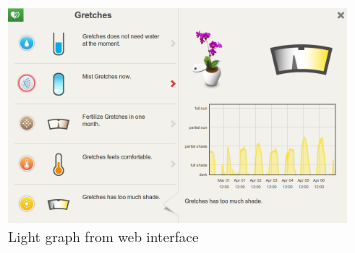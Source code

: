 \begin{figure}
        \centering
        \includegraphics[width=0.8\textwidth]{img/koubachi/lightgraph.png}
        \caption{Light graph from web interface}
        \label{fig:koubachigraph}
\end{figure}

